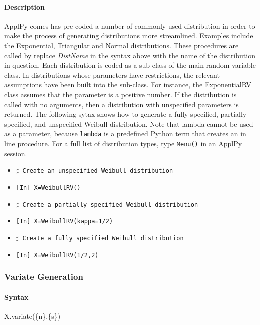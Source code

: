 \documentclass[11pt,epsfig,psfig,doublespace,singlespace]{article}
\begin{document}
\paragraph{Description} ApplPy comes has pre-coded a number of commonly used distribution in order to make the process of generating distributions more streamlined. Examples include the Exponential, Triangular and Normal distributions. These procedures are called by replace \textit{DistName} in the syntax above with the name of the distribution in question. Each distribution is coded as a sub-class of the main random variable class. In distributions whose parameters have restrictions, the relevant assumptions have been built into the sub-class. For instance, the ExponentialRV class assumes that the parameter is a positive number. If the distribution is called with no arguments, then a distribution with unspecified parameters is returned. The following sytax shows how to generate a fully specified, partially specified, and unspecified Weibull distribution. Note that lambda cannot be used as a parameter, because \texttt{lambda} is a predefined Python term that creates an in line procedure. For a full list of distribution types, type \texttt{Menu()} in an ApplPy session.
\begin{itemize}
\item \texttt{$\sharp$ Create an unspecified Weibull distribution}
\item \texttt{[In] X=WeibullRV()}
\item \texttt{$\sharp$ Create a partially specified Weibull distribution}
\item \texttt{[In] X=WeibullRV(kappa=1/2)}
\item \texttt{$\sharp$ Create a fully specified Weibull distribution}
\item \texttt{[In] X=WeibullRV(1/2,2)}
\end{itemize}
\subsubsection{Variate Generation}
\paragraph{Syntax} X.variate(\{n\},\{s\})
\end{document}
